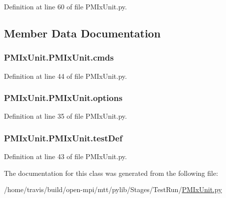 Definition at line 60 of file P\-M\-Ix\-Unit.\-py.



\subsection{Member Data Documentation}
\hypertarget{class_p_m_ix_unit_1_1_p_m_ix_unit_a1130f07074aeff223235a147440868c4}{
\subsubsection[{cmds}]{\setlength{\rightskip}{0pt plus 5cm}P\-M\-Ix\-Unit.\-P\-M\-Ix\-Unit.\-cmds}}\label{class_p_m_ix_unit_1_1_p_m_ix_unit_a1130f07074aeff223235a147440868c4}


Definition at line 44 of file P\-M\-Ix\-Unit.\-py.

\hypertarget{class_p_m_ix_unit_1_1_p_m_ix_unit_a6c56979e7226a414874653b3e7a17dd8}{
\subsubsection[{options}]{\setlength{\rightskip}{0pt plus 5cm}P\-M\-Ix\-Unit.\-P\-M\-Ix\-Unit.\-options}}\label{class_p_m_ix_unit_1_1_p_m_ix_unit_a6c56979e7226a414874653b3e7a17dd8}


Definition at line 35 of file P\-M\-Ix\-Unit.\-py.

\hypertarget{class_p_m_ix_unit_1_1_p_m_ix_unit_a08b01eaf2867a0a02f8598018739e843}{
\subsubsection[{test\-Def}]{\setlength{\rightskip}{0pt plus 5cm}P\-M\-Ix\-Unit.\-P\-M\-Ix\-Unit.\-test\-Def}}\label{class_p_m_ix_unit_1_1_p_m_ix_unit_a08b01eaf2867a0a02f8598018739e843}


Definition at line 43 of file P\-M\-Ix\-Unit.\-py.



The documentation for this class was generated from the following file\-:\begin{DoxyCompactItemize}
\item 
/home/travis/build/open-\/mpi/mtt/pylib/\-Stages/\-Test\-Run/\hyperlink{_p_m_ix_unit_8py}{P\-M\-Ix\-Unit.\-py}\end{DoxyCompactItemize}
